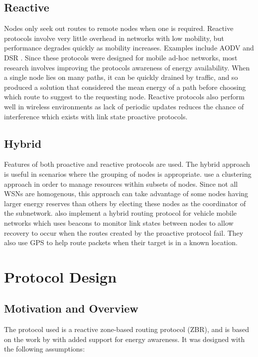 \documentclass[12pt]{article}
\begin{document}
\subsection{Reactive} 
Nodes only seek out routes to remote nodes when one is required. Reactive protocols involve very little overhead in networks with low mobility, but performance degrades quickly as mobility increases. Examples include AODV \cite{aodv} and DSR \cite{dsr}. Since these protocols were designed for mobile ad-hoc networks, most research involves improving the protocols awareness of energy availability. When a single node lies on many paths, it can be quickly drained by traffic, and so \cite{eaodv} produced a solution that considered the mean energy of a path before choosing which route to suggest to the requesting node. 
Reactive protocols also perform well in wireless environments as lack of periodic updates reduces the chance of interference which exists with link state proactive protocols.

\subsection{Hybrid} 
Features of both proactive and reactive protocols are used. The hybrid approach is useful in scenarios where the grouping of nodes is appropriate. \cite{cluster} use a clustering approach in order to manage resources within subsets of nodes. Since not all WSNs are homogenous, this approach can take advantage of some nodes having larger energy reserves than others by electing these nodes as the coordinator of the subnetwork. \cite{vanet} also implement a hybrid routing protocol for vehicle mobile networks which uses beacons to monitor link states between nodes to allow recovery to occur when the routes created by the proactive protocol fail. They also use GPS to help route packets when their target is in a known location.

\pagebreak
\section{Protocol Design} \label{protodesign}

\subsection{Motivation and Overview}

The protocol used is a reactive zone-based routing protocol (ZBR), and is based on the work by \cite{zbrp} with added support for energy awareness. It was designed with the following assumptions:
\end{document}
